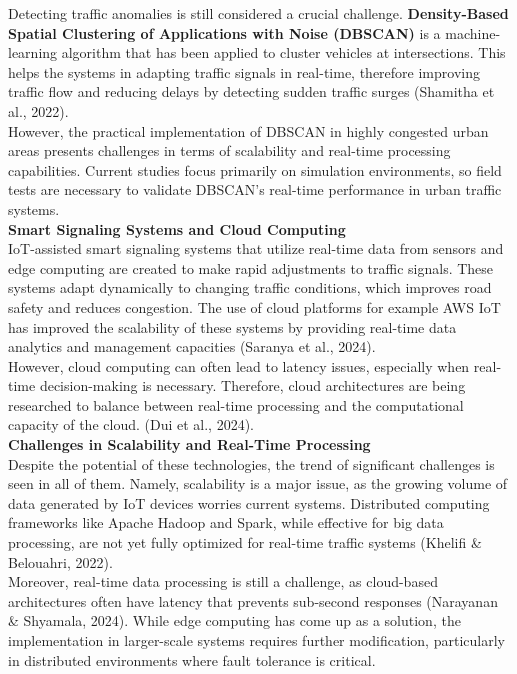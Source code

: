 \documentclass[12pt,a4paper]{article}
\begin{document}
Detecting traffic anomalies is still considered a crucial challenge. \textbf{Density-Based Spatial Clustering of Applications with Noise (DBSCAN)} is a machine-learning algorithm that has been applied to cluster vehicles at intersections. This helps the systems in adapting traffic signals in real-time, therefore improving traffic flow and reducing delays by detecting sudden traffic surges (Shamitha et al., 2022). \\

However, the practical implementation of DBSCAN in highly congested urban areas presents challenges in terms of scalability and real-time processing capabilities. Current studies focus primarily on simulation environments, so field tests are necessary to validate DBSCAN’s real-time performance in urban traffic systems. \\

\textbf{Smart Signaling Systems and Cloud Computing }\\

IoT-assisted smart signaling systems that utilize real-time data from sensors and edge computing are created to make rapid adjustments to traffic signals. These systems adapt dynamically to changing traffic conditions, which improves road safety and reduces congestion. The use of cloud platforms for example AWS IoT has improved the scalability of these systems by providing real-time data analytics and management capacities (Saranya et al., 2024). \\ 

However, cloud computing can often lead to latency issues, especially when real-time decision-making is necessary. Therefore, cloud architectures are being researched to balance between real-time processing and the computational capacity of the cloud. (Dui et al., 2024). \\

\textbf{Challenges in Scalability and Real-Time Processing }\\

Despite the potential of these technologies, the trend of significant challenges is seen in all of them. Namely, scalability is a major issue, as the growing volume of data generated by IoT devices worries current systems. Distributed computing frameworks like Apache Hadoop and Spark, while effective for big data processing, are not yet fully optimized for real-time traffic systems (Khelifi \& Belouahri, 2022).  \\

Moreover, real-time data processing is still a challenge, as cloud-based architectures often have latency that prevents sub-second responses (Narayanan \& Shyamala, 2024). While edge computing has come up as a solution, the implementation in larger-scale systems requires further modification, particularly in distributed environments where fault tolerance is critical. \\
\end{document}
